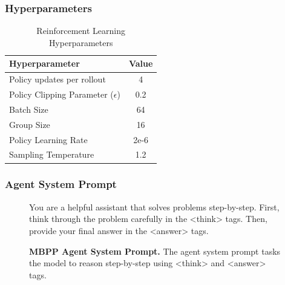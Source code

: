 \documentclass{article}
\newcommand{\newcap}[2]{\caption[#1]{\textbf{#1} #2}}
\theoremstyle{plain}
\begin{document}
\subsubsection{Hyperparameters}
\label{appx:exp:hyperparameters}

\begin{table}[h!]
\centering
\caption{Reinforcement Learning Hyperparameters}
\vspace{1em}
\label{tab:rl_hyperparams}
\begin{tabular}{lc}
\toprule
\textbf{Hyperparameter} & \textbf{Value} \\
\midrule
Policy updates per rollout & 4 \\
Policy Clipping Parameter ($\epsilon$) & 0.2 \\
Batch Size & 64 \\
Group Size & 16 \\
Policy Learning Rate & 2e-6 \\
Sampling Temperature & 1.2 \\
\bottomrule
\end{tabular}
\end{table}

\FloatBarrier

\subsubsection{Agent System Prompt}
\label{appx:exp:mbpp-agent-prompt}
\begin{figure}[h!]
\begin{tcolorbox}[colback=gray!15, colframe=gray!50, arc=2mm, boxrule=0.5mm]
\small You are a helpful assistant that solves problems step-by-step. First, think through the problem carefully in the <think> tags. Then, provide your final answer in the <answer> tags.
\end{tcolorbox}
\newcap{MBPP Agent System Prompt.}{The agent system prompt tasks the model to reason step-by-step using <think> and <answer> tags.}
\label{fig:mbpp_agent_prompt}
\end{figure}
\end{document}
